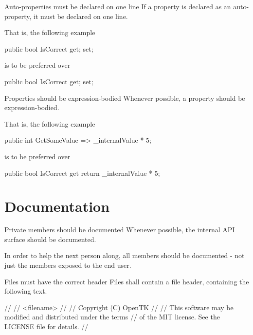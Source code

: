 \documentclass[11pt,a4paper]{article}
\begin{document}
\begin{must}{Auto-properties must be declared on one line}
If a property is declared as an auto-property, it must be declared on one line.
\end{must}

That is, the following example 
\begin{code}
public bool IsCorrect { get; set; }
\end{code}

is to be preferred over

\begin{code}
public bool IsCorrect 
{
    get; 
    set; 
}
\end{code}

\begin{should}{Properties should be expression-bodied}
Whenever possible, a property should be expression-bodied.
\end{should}

That is, the following example 
\begin{code}
public int GetSomeValue => _internalValue * 5;
\end{code}

is to be preferred over

\begin{code}
public bool IsCorrect 
{
    get
    {
        return _internalValue * 5;
    }
}
\end{code}


\section{Documentation}
\begin{should}{Private members should be documented}
Whenever possible, the internal API surface should be documented.
\end{should}

In order to help the next person along, all members should be documented - not just the members exposed to the end user.

\begin{must}{Files must have the correct header}
Files shall contain a file header, containing the following text.
\end{must}

\begin{code}
// 
//  <filename>
//
//  Copyright (C) OpenTK
//
//  This software may be modified and distributed under the terms
//  of the MIT license. See the LICENSE file for details.
//
\end{code}
\end{document}

